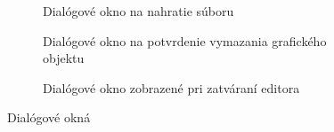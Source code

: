\begin{figure}[H]
	\centering
	\begin{subfigure}[t]{0.48\linewidth}	
		\caption{Dialógové okno na nahratie súboru}
		\label{obr:editor-dialog-upload}
	\end{subfigure}
	\quad
	\begin{subfigure}[t]{0.48\linewidth}	
		\caption{Dialógové okno na potvrdenie vymazania grafického objektu}
		\label{obr:editor-dialog-delete}
	\end{subfigure}
	\quad
	\begin{subfigure}[t]{0.7\linewidth}	
		\caption{Dialógové okno zobrazené pri zatváraní editora}
		\label{obr:editor-dialog-close}
	\end{subfigure}
	\caption{Dialógové okná}
\end{figure}
\FloatBarrier